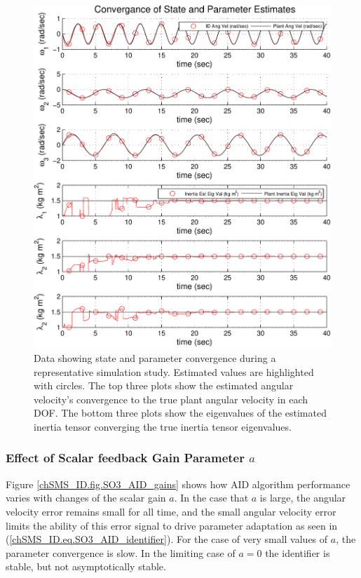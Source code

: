 \begin{center}
\begin{figure}[htbp]
  \begin{center}
    \includegraphics[width=150mm]{./chSMS_ID/images/SO3AID_stateParamConv}
  \end{center}
  \caption{ Data showing state and parameter convergence during a
    representative simulation study.  Estimated values are highlighted
    with circles.  The top three plots show the estimated angular
    velocity's convergence to the true plant angular velocity in each
    \ac{DOF}.  The bottom three plots show the eigenvalues of the
    estimated inertia tensor converging the true inertia tensor
    eigenvalues.}
  \label{chSMS_ID.fig.SO3_AID_basic}
\end{figure}
\end{center}


\subsubsection{Effect of Scalar feedback Gain Parameter $a$}

Figure \ref{chSMS_ID.fig.SO3_AID_gains} shows how \ac{AID} algorithm performance
varies with changes of the scalar gain $a$.  In the case that $a$ is
large, the angular velocity error remains small for all time, and  the
small angular velocity error limits the ability of this error signal
to drive parameter adaptation as seen in
(\ref{chSMS_ID.eq.SO3_AID_identifier}).  For the case of very small
values of $a$, the parameter convergence is slow.  In the limiting
case of $a=0$ the identifier is stable, but not asymptotically stable.


